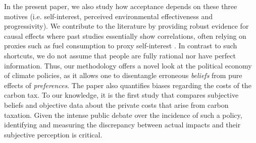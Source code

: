\documentclass[12pt]{article} %
\begin{document}
In the present paper, we also study how acceptance depends on these three motives (i.e. self-interest, perceived environmental effectiveness and progressivity). We contribute to the literature by providing robust evidence for causal effects where past studies essentially show correlations, often relying on proxies such as fuel consumption to proxy self-interest \citep[e.g.][]{thalmann_public_2004,kallbekken_saelen_2011,anderson_can_2019}. In contrast to such shortcuts, we do not assume that people are fully rational nor have perfect information. Thus, our methodology offers a novel look at the political economy of climate policies, as it allows one to disentangle erroneous \emph{beliefs} from pure effects of \emph{preferences}. The paper also quantifies biases regarding the costs of the carbon tax. To our knowledge, it is the first study that compares subjective beliefs and objective data about the private costs that arise from carbon taxation. Given the intense public debate over the incidence of such a policy, identifying and measuring the discrepancy between actual impacts and their subjective perception is critical.
\end{document}
